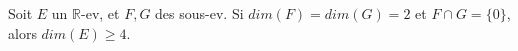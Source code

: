 Soit $E$ un $\mathbb R$-ev, et $F,G$ des sous-ev. Si $dim(F)=dim(G)=2$ et $F \cap G=\{0\}$, alors $dim(E) \geq 4$.

\begin{reponses}
\end{reponses}

